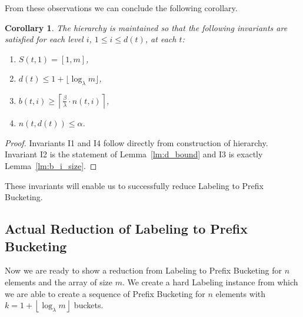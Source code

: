 \documentclass{llncs}
\newtheorem{corollary}[definition]{Corollary}
\newcommand{\hb}[2]{b\left(#1, #2\right)}
\newcommand{\hn}[2]{n\left(#1, #2\right)}
\newcommand{\hS}[2]{S\left(#1, #2\right)}
\newcommand{\PB}{Prefix Bucketing}
\begin{document}
From these observations we can conclude the following corollary.

\begin{corollary}
\label{cl:invariants}
The hierarchy is maintained so that the following invariants are satisfied for each level $i$, $1 \leq i \leq d(t)$, at each $t$:
\begin{enumerate}
	\item[I1)] $\hS{t}{1} = [1, m]$,
	\item[I2)] $d(t) \leq 1 + \lfloor\log_\lambda m\rfloor$,
	\item[I3)] $\hb{t}{i} \geq \left\lceil\frac{\beta}{\lambda} \cdot \hn{t}{i}\right\rceil$,
	\item[I4)] $\hn{t}{d(t)} \leq \alpha$.
\end{enumerate}
\end{corollary}
\begin{proof}
Invariants I1 and I4 follow directly from construction of hierarchy. Invariant I2 is the statement of Lemma~\ref{lm:d_bound} and I3 is exactly Lemma~\ref{lm:b_i_size}.
\end{proof}

These invariants will enable us to successfully reduce Labeling to Prefix Bucketing.

\subsection{Actual Reduction of Labeling to Prefix Bucketing}

Now we are ready to show a reduction from Labeling to \PB{} for $n$ elements and the array of size $m$.
We create a hard Labeling instance from which we are able to create a sequence of \PB{} for $n$ elements with $k = 1 + \left\lfloor \log_\lambda m \right\rfloor$ buckets.
\end{document}
